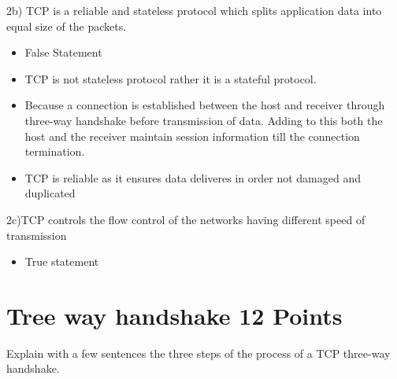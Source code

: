 \documentclass{resources/WeSTassignment}
\begin{document}
2b) TCP is a reliable and stateless protocol which splits application data into equal
size of the packets.
			\begin{itemize}
			\item False Statement
			\item TCP is not stateless protocol rather it is a stateful protocol.
			\item Because a connection is established between the host and receiver through three-way handshake before transmission of data. Adding to this both the host and the receiver maintain session information till the connection termination.
			\item TCP is reliable as it ensures data deliveres in order not damaged and duplicated 
			\end{itemize}
2c)TCP controls the flow control of the networks having different speed of transmission 
			\begin{itemize}
			\item True statement
			\end{itemize}




\section{Tree way handshake \hfill{12 Points}}
Explain with a few sentences the three steps of the process of a TCP three-way handshake.
\end{document}
